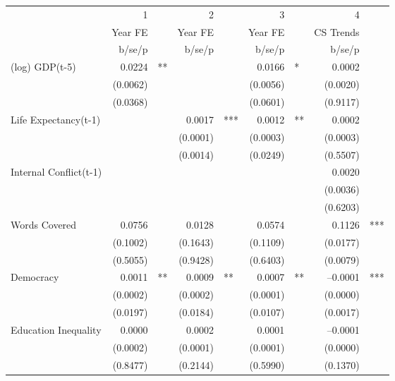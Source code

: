 \begin{tabular} {l* {4}{r @{} l}}
\hline
            &           1&   &           2&   &           3&   &           4&   \\
            &     Year FE&   &     Year FE&   &     Year FE&   &   CS Trends&   \\
            &      b/se/p&   &      b/se/p&   &      b/se/p&   &      b/se/p&   \\
\hline
(log) GDP(t-5)&      0.0224&** &            &   &      0.0166&*  &      0.0002&   \\
            &    (0.0062)&   &            &   &    (0.0056)&   &    (0.0020)&   \\
            &    (0.0368)&   &            &   &    (0.0601)&   &    (0.9117)&   \\
Life Expectancy(t-1) &            &   &      0.0017&***&      0.0012&** &      0.0002&   \\
            &            &   &    (0.0001)&   &    (0.0003)&   &    (0.0003)&   \\
            &            &   &    (0.0014)&   &    (0.0249)&   &    (0.5507)&   \\
Internal Conflict(t-1)&            &   &            &   &            &   &      0.0020&   \\
            &            &   &            &   &            &   &    (0.0036)&   \\
            &            &   &            &   &            &   &    (0.6203)&   \\
Words Covered&      0.0756&   &      0.0128&   &      0.0574&   &      0.1126&***\\
            &    (0.1002)&   &    (0.1643)&   &    (0.1109)&   &    (0.0177)&   \\
            &    (0.5055)&   &    (0.9428)&   &    (0.6403)&   &    (0.0079)&   \\
Democracy   &      0.0011&** &      0.0009&** &      0.0007&** &    --0.0001&***\\
            &    (0.0002)&   &    (0.0002)&   &    (0.0001)&   &    (0.0000)&   \\
            &    (0.0197)&   &    (0.0184)&   &    (0.0107)&   &    (0.0017)&   \\
Education Inequality&      0.0000&   &      0.0002&   &      0.0001&   &    --0.0001&   \\
            &    (0.0002)&   &    (0.0001)&   &    (0.0001)&   &    (0.0000)&   \\
            &    (0.8477)&   &    (0.2144)&   &    (0.5990)&   &    (0.1370)&   \\

\end{tabular}
